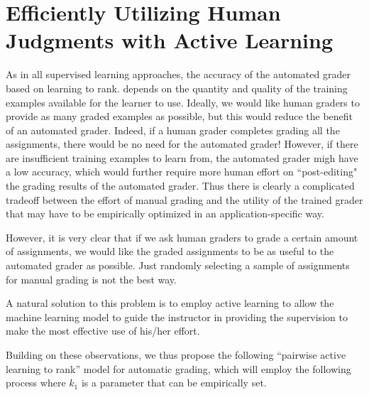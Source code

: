 \section{Efficiently Utilizing Human Judgments with Active Learning}
As in all supervised learning approaches, 
the accuracy of  the automated grader based on learning to rank. depends
on the quantity and quality of the training examples available for the 
learner to use. Ideally, we would like human graders to provide
 as many graded examples as possible, but this would
reduce the benefit of an automated grader. Indeed,
if a human grader completes grading all the assignments,
there would be no need for the automated grader!
However, if there are insufficient training examples 
to learn from, the automated grader migh have a low accuracy,
which would further require more human effort on 
``post-editing" the grading results of the automated grader. 
Thus there is clearly a complicated tradeoff between
the effort of manual grading and the utility of the trained
 grader that may have to be empirically optimized in an application-specific way.

However, it is very clear that if we ask human graders to grade
a certain amount of assignments, we would like the
graded assignments to be as useful to the automated grader as possible.
Just randomly selecting a sample of assignments for manual grading
is not the best way. 
A natural solution to this problem is to employ 
active learning to allow the machine learning model to
guide the instructor in providing the supervision to make the most
effective use of his/her effort.

Building on these observations, we thus propose the following ``pairwise active
learning to rank'' model for automatic grading, which will employ the
following process where $k_1$ is a parameter that can be empirically set. 

